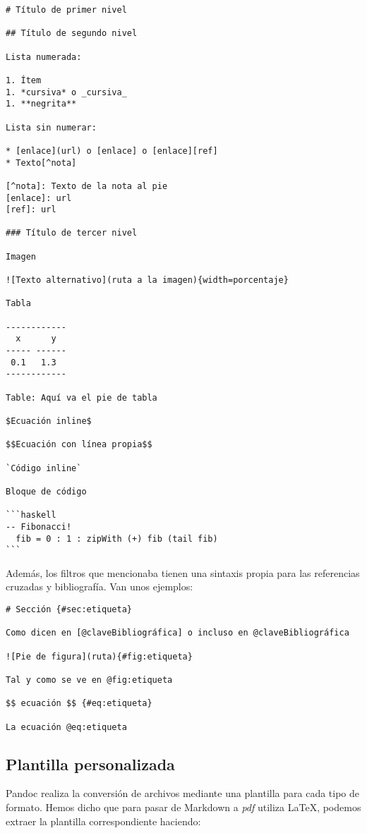 \begin{lstlisting}
# Título de primer nivel

## Título de segundo nivel

Lista numerada:

1. Ítem
1. *cursiva* o _cursiva_
1. **negrita**

Lista sin numerar:

* [enlace](url) o [enlace] o [enlace][ref]
* Texto[^nota]

[^nota]: Texto de la nota al pie
[enlace]: url
[ref]: url

### Título de tercer nivel

Imagen

![Texto alternativo](ruta a la imagen){width=porcentaje}

Tabla

------------
  x      y
----- ------
 0.1   1.3 
------------

Table: Aquí va el pie de tabla

$Ecuación inline$

$$Ecuación con línea propia$$

`Código inline`

Bloque de código

```haskell
-- Fibonacci!
  fib = 0 : 1 : zipWith (+) fib (tail fib)
```
\end{lstlisting}

Además, los filtros que mencionaba tienen una sintaxis propia para las
referencias cruzadas y bibliografía. Van unos ejemplos:

\begin{lstlisting}
# Sección {#sec:etiqueta}

Como dicen en [@claveBibliográfica] o incluso en @claveBibliográfica

![Pie de figura](ruta){#fig:etiqueta}

Tal y como se ve en @fig:etiqueta

$$ ecuación $$ {#eq:etiqueta}

La ecuación @eq:etiqueta
\end{lstlisting}

\subsection{Plantilla personalizada}

Pandoc realiza la conversión de archivos mediante una plantilla para
cada tipo de formato. Hemos dicho que para pasar de Markdown a
\emph{pdf} utiliza LaTeX, podemos extraer la plantilla correspondiente
haciendo:

